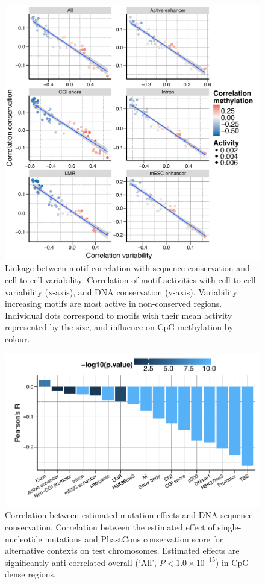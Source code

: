 \begin{figure}[htbp!]
\centering
\includegraphics[width=1.0\textwidth]{var_cons}
\caption[Linkage between motif correlation with sequence conservation and cell-to-cell variability.]{Linkage between motif correlation with sequence conservation and cell-to-cell variability. Correlation of motif activities with cell-to-cell variability (x-axis), and DNA conservation (y-axis). Variability increasing motifs are most active in non-conserved regions. Individual dots correspond to motifs with their mean activity represented by the size, and influence on CpG methylation by colour.}
\label{fig:dcpg_var_cons}
\end{figure}

\begin{figure}[htbp!]
\centering
\includegraphics[width=1.0\textwidth]{mut_cons}
\caption[Correlation between estimated mutation effects and DNA sequence conservation.]{Correlation between estimated mutation effects and DNA sequence conservation. Correlation between the estimated effect of single-nucleotide mutations and PhastCons conservation score for alternative contexts on test chromosomes. Estimated effects are significantly anti-correlated overall (`All', $P<1.0\times10^{-15}$) in CpG dense regions.}
\label{fig:dcpg_mut_cons}
\end{figure}
